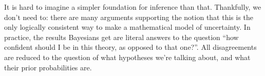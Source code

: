 \documentclass[a4paper, 12pt]{article}
\begin{document}
It is hard to imagine a simpler foundation for inference than that. Thankfully,
we don't need to: there are many arguments supporting the notion that this is
the only logically consistent way to make a mathematical model of uncertainty.
In practice, the results Bayesians get are literal answers to the question
``how confident should I be in this theory, as opposed to that one?''. All
disagreements are reduced to the question of what hypotheses we're talking
about, and what their prior probabilities are.





\end{document}
